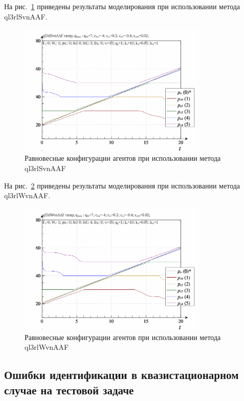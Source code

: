 На рис.~\ref{atu:f:qls_ramp_ql3rlSvnAAF} приведены результаты моделирования
при использовании метода ql3rlSvnAAF.

\begin{figure}[htb!]
  \centerline{
    \includegraphics[width=0.8\textwidth]{p/ramp/qls-p_t_pi_ql3rlSvnAAF_ramp.png}
  }
  \caption{Равновесные конфигурации агентов при использовании метода ql3rlSvnAAF}
  \label{atu:f:qls_ramp_ql3rlSvnAAF}
\end{figure}


На рис.~\ref{atu:f:qls_ramp_ql3rlWvnAAF} приведены результаты моделирования
при использовании метода ql3rlWvnAAF.

\begin{figure}[htb!]
  \centerline{
    \includegraphics[width=0.8\textwidth]{p/ramp/qls-p_t_pi_ql3rlWvnAAF_ramp.png}
  }
  \caption{Равновесные конфигурации агентов при использовании метода ql3rlWvnAAF}
  \label{atu:f:qls_ramp_ql3rlWvnAAF}
\end{figure}



\subsection{Ошибки идентификации в квазистационарном случае на тестовой задаче}  %

